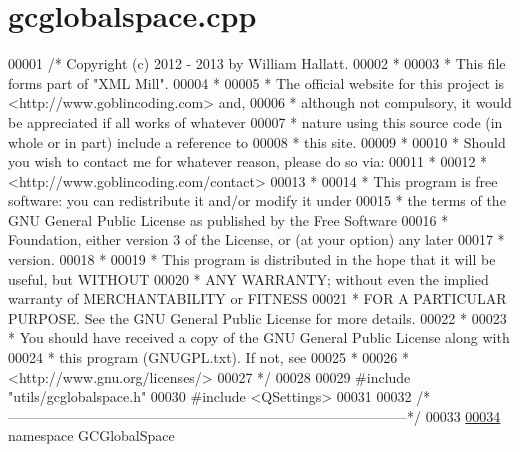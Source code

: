 \hypertarget{gcglobalspace_8cpp_source}{\section{gcglobalspace.\-cpp}
}

\begin{DoxyCode}
00001 \textcolor{comment}{/* Copyright (c) 2012 - 2013 by William Hallatt.}
00002 \textcolor{comment}{ *}
00003 \textcolor{comment}{ * This file forms part of "XML Mill".}
00004 \textcolor{comment}{ *}
00005 \textcolor{comment}{ * The official website for this project is <http://www.goblincoding.com> and,}
00006 \textcolor{comment}{ * although not compulsory, it would be appreciated if all works of whatever}
00007 \textcolor{comment}{ * nature using this source code (in whole or in part) include a reference to}
00008 \textcolor{comment}{ * this site.}
00009 \textcolor{comment}{ *}
00010 \textcolor{comment}{ * Should you wish to contact me for whatever reason, please do so via:}
00011 \textcolor{comment}{ *}
00012 \textcolor{comment}{ *                 <http://www.goblincoding.com/contact>}
00013 \textcolor{comment}{ *}
00014 \textcolor{comment}{ * This program is free software: you can redistribute it and/or modify it
       under}
00015 \textcolor{comment}{ * the terms of the GNU General Public License as published by the Free
       Software}
00016 \textcolor{comment}{ * Foundation, either version 3 of the License, or (at your option) any later}
00017 \textcolor{comment}{ * version.}
00018 \textcolor{comment}{ *}
00019 \textcolor{comment}{ * This program is distributed in the hope that it will be useful, but WITHOUT}
00020 \textcolor{comment}{ * ANY WARRANTY; without even the implied warranty of MERCHANTABILITY or
       FITNESS}
00021 \textcolor{comment}{ * FOR A PARTICULAR PURPOSE.  See the GNU General Public License for more
       details.}
00022 \textcolor{comment}{ *}
00023 \textcolor{comment}{ * You should have received a copy of the GNU General Public License along with}
00024 \textcolor{comment}{ * this program (GNUGPL.txt).  If not, see}
00025 \textcolor{comment}{ *}
00026 \textcolor{comment}{ *                    <http://www.gnu.org/licenses/>}
00027 \textcolor{comment}{ */}
00028 
00029 \textcolor{preprocessor}{#include "utils/gcglobalspace.h"}
00030 \textcolor{preprocessor}{#include <QSettings>}
00031 
00032 \textcolor{comment}{/*
      --------------------------------------------------------------------------------------*/}
00033 
\hypertarget{gcglobalspace_8cpp_source_l00034}{}\hyperlink{namespace_g_c_global_space}{00034} \textcolor{keyword}{namespace }GCGlobalSpace

\end{DoxyCode}
